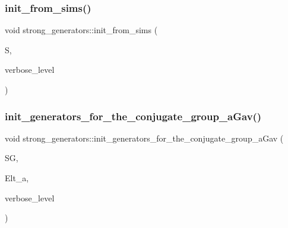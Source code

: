 \mbox{\label{classstrong__generators_a2b997decdab82e889c1151f29a846a66}} 
\subsubsection{\texorpdfstring{init\+\_\+from\+\_\+sims()}{init\_from\_sims()}}
{\footnotesize\ttfamily void strong\+\_\+generators\+::init\+\_\+from\+\_\+sims (\begin{DoxyParamCaption}\item[{\mbox{\hyperlink{classsims}{sims}} $\ast$}]{S,  }\item[{\mbox{\hyperlink{galois_8h_a09fddde158a3a20bd2dcadb609de11dc}{I\+NT}}}]{verbose\+\_\+level }\end{DoxyParamCaption})}

\mbox{\label{classstrong__generators_af398bc7eb2c325ffd594d339dd1869b4}} 
\subsubsection{\texorpdfstring{init\+\_\+generators\+\_\+for\+\_\+the\+\_\+conjugate\+\_\+group\+\_\+a\+Gav()}{init\_generators\_for\_the\_conjugate\_group\_aGav()}}
{\footnotesize\ttfamily void strong\+\_\+generators\+::init\+\_\+generators\+\_\+for\+\_\+the\+\_\+conjugate\+\_\+group\+\_\+a\+Gav (\begin{DoxyParamCaption}\item[{\mbox{\hyperlink{classstrong__generators}{strong\+\_\+generators}} $\ast$}]{SG,  }\item[{\mbox{\hyperlink{galois_8h_a09fddde158a3a20bd2dcadb609de11dc}{I\+NT}} $\ast$}]{Elt\+\_\+a,  }\item[{\mbox{\hyperlink{galois_8h_a09fddde158a3a20bd2dcadb609de11dc}{I\+NT}}}]{verbose\+\_\+level }\end{DoxyParamCaption})}

